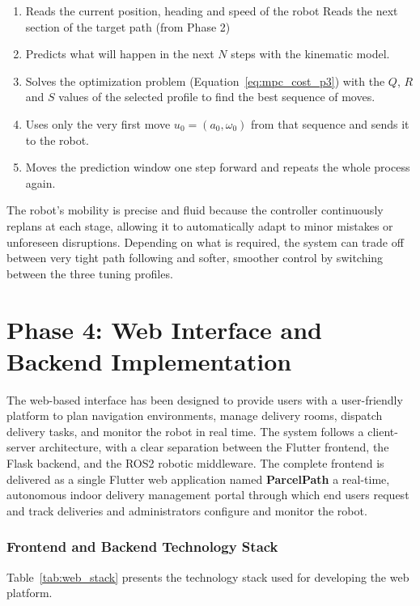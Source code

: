 \begin{enumerate}[noitemsep]
	\item Reads the current position, heading and speed of the robot Reads the next section of the target path (from Phase 2)
	\item Predicts what will happen in the next $N$ steps with the kinematic model.
	\item  Solves the optimization problem (Equation~\ref{eq:mpc_cost_p3}) with the $Q$, $R$ and $S$ values of the selected profile to find the best sequence of moves.
	\item Uses only the very first move $u_0 = (a_0, \omega_0)$ from that sequence and sends it to the robot.
	\item Moves the prediction window one step forward and repeats the whole process again.
\end{enumerate}

The robot's mobility is precise and fluid because the controller continuously replans at each stage, allowing it to automatically adapt to minor mistakes or unforeseen disruptions. Depending on what is required, the system can trade off between very tight path following and softer, smoother control by switching between the three tuning profiles.




\section{Phase 4: Web Interface and Backend Implementation}

The web-based interface has been designed to provide users with a user-friendly platform to plan navigation environments, manage delivery rooms, dispatch delivery tasks, and monitor the robot in real time. The system follows a client-server architecture, with a clear separation between the Flutter frontend, the Flask backend, and the ROS2 robotic middleware. The complete frontend is delivered as a single Flutter web application named \textbf{ParcelPath} a real-time, autonomous indoor delivery management portal through which end users request and track deliveries and administrators configure and monitor the robot.

\subsubsection{Frontend and Backend Technology Stack}

Table~\ref{tab:web_stack} presents the technology stack used for developing the web platform.

